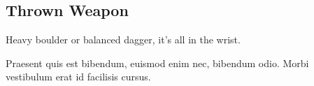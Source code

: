\subsection{Thrown Weapon}

Heavy boulder or balanced dagger, it's all in the wrist.

\begin{quotebox}
Praesent quis est bibendum, euismod enim nec, bibendum odio. Morbi vestibulum erat id facilisis cursus.
\end{quotebox}
